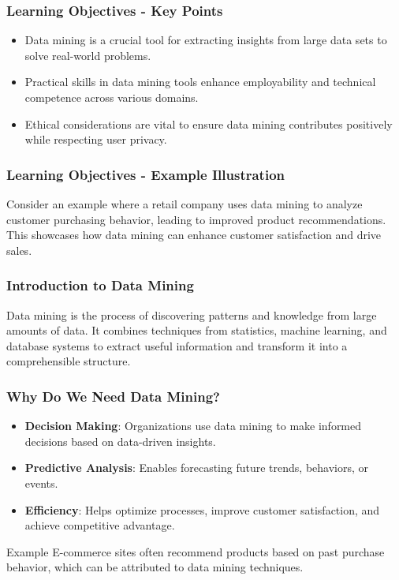 \documentclass[aspectratio=169]{beamer}
\begin{document}
\begin{frame}[fragile]
    \frametitle{Learning Objectives - Key Points}
    \begin{itemize}
        \item Data mining is a crucial tool for extracting insights from large data sets to solve real-world problems.
        \item Practical skills in data mining tools enhance employability and technical competence across various domains.
        \item Ethical considerations are vital to ensure data mining contributes positively while respecting user privacy.
    \end{itemize}
\end{frame}

\begin{frame}[fragile]
    \frametitle{Learning Objectives - Example Illustration}
    Consider an example where a retail company uses data mining to analyze customer purchasing behavior, leading to improved product recommendations. This showcases how data mining can enhance customer satisfaction and drive sales.
\end{frame}

\begin{frame}[fragile]
    \frametitle{Introduction to Data Mining}
    Data mining is the process of discovering patterns and knowledge from large amounts of data. It combines techniques from statistics, machine learning, and database systems to extract useful information and transform it into a comprehensible structure.
\end{frame}

\begin{frame}[fragile]
    \frametitle{Why Do We Need Data Mining?}
    \begin{itemize}
        \item \textbf{Decision Making}: Organizations use data mining to make informed decisions based on data-driven insights.
        \item \textbf{Predictive Analysis}: Enables forecasting future trends, behaviors, or events.
        \item \textbf{Efficiency}: Helps optimize processes, improve customer satisfaction, and achieve competitive advantage.
    \end{itemize}

    \begin{block}{Example}
        E-commerce sites often recommend products based on past purchase behavior, which can be attributed to data mining techniques.
    \end{block}
\end{frame}
\end{document}
